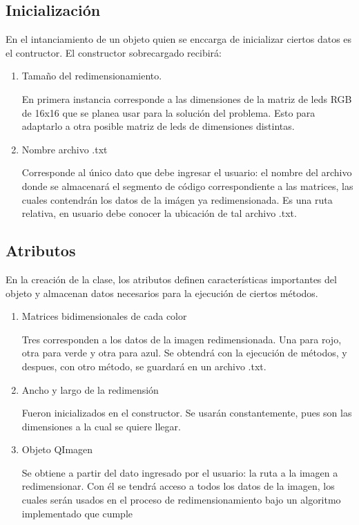 \documentclass{article}
\begin{document}
\subsection{Inicialización} \label{Inicializacion}
En el intanciamiento de un objeto quien se enccarga de inicializar ciertos datos es el contructor. 
El constructor sobrecargado recibirá: 
\begin{enumerate}
  \item Tamaño del redimensionamiento.
  
  En primera instancia corresponde a las dimensiones de la matriz de leds RGB de 16x16 que se planea usar para la solución del problema.
  Esto para adaptarlo a otra posible matriz de leds de dimensiones distintas. 
  \item Nombre archivo .txt
  
  Corresponde al único dato que debe ingresar el usuario: el nombre del archivo donde se almacenará el segmento de código correspondiente a las matrices, las cuales contendrán los datos de la imágen ya redimensionada. 
  Es una ruta relativa, en usuario debe conocer la ubicación de tal archivo .txt.
  
\end{enumerate}
\subsection{Atributos} \label{Atributos} 
En la creación de la clase, los atributos definen características importantes del objeto y almacenan datos necesarios para la ejecución de ciertos métodos. 

\begin{enumerate}
  \item Matrices bidimensionales de cada color
  
  Tres corresponden a los datos de la imagen redimensionada. 
  Una para rojo, otra para verde y otra para azul. Se obtendrá con la ejecución de métodos, y despues, con otro método, se guardará en un archivo .txt.
  
  \item Ancho y largo de la redimensión
  
  Fueron inicializados en el constructor. Se usarán constantemente, pues son las dimensiones a la cual se quiere llegar.
  
  \item Objeto QImagen
  
  Se obtiene a partir del dato ingresado por el usuario: la ruta a la imagen a redimensionar. Con él se tendrá acceso a todos los datos de la imagen, los cuales serán usados en el proceso de redimensionamiento bajo un algoritmo implementado que cumple 
  
\end{enumerate}
\end{document}
